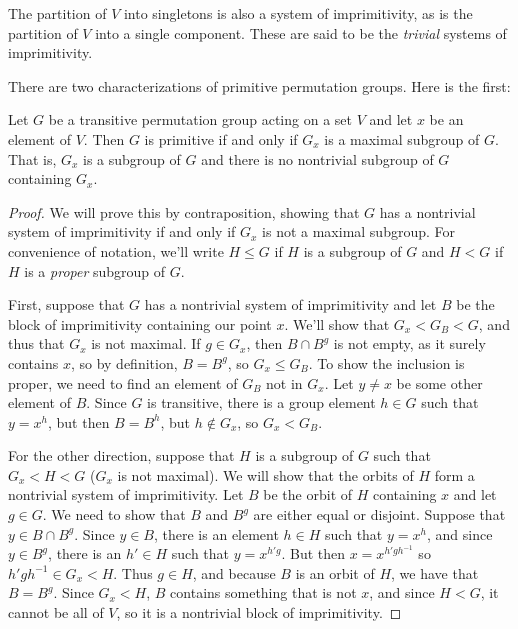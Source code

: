 The partition of $V$ into singletons is also a system of imprimitivity, as is the partition of $V$ into a single component.  These are said to be the \textit{trivial} systems of imprimitivity.


There are two characterizations of primitive permutation groups.  Here is the first:

\begin{lemma}
	
	Let $G$ be a transitive permutation group acting on a set $V$ and let $x$ be an element of $V$.  Then $G$ is primitive if and only if $G_x$ is a maximal subgroup of $G$.  That is, $G_x$ is a subgroup of $G$ and there is no nontrivial subgroup of $G$ containing $G_x$.
	
	
\end{lemma}


\begin{proof}
	
	We will prove this by contraposition, showing that $G$ has a nontrivial system of imprimitivity if and only if $G_x$ is not a maximal subgroup.  For convenience of notation, we'll write $H\leq G$ if $H$ is a subgroup of $G$ and $H<G$ if $H$ is a \textit{proper} subgroup of $G$.
	
	First, suppose that $G$ has a nontrivial system of imprimitivity and let $B$ be the block of imprimitivity containing our point $x$.  We'll show that $G_x<G_B<G$, and thus that $G_x$ is not maximal.  If $g\in G_x$, then $B\cap B^g$ is not empty, as it surely contains $x$, so by definition, $B=B^g$, so $G_x\leq G_B$.  To show the inclusion is proper, we need to find an element of $G_B$ not in $G_x$.  Let $y\neq x$ be some other element of $B$.  Since $G$ is transitive, there is a group element $h\in G$ such that $y=x^h$, but then $B=B^h$, but $h\notin G_x$, so $G_x<G_B$.
	
	For the other direction, suppose that $H$ is a subgroup of $G$ such that $G_x<H<G$ ($G_x$ is not maximal).  We will show that the orbits of $H$ form a nontrivial system of imprimitivity.  Let $B$ be the orbit of $H$ containing $x$ and let $g\in G$.  We need to show that $B$ and $B^g$ are either equal or disjoint.  Suppose that $y\in B\cap B^g$.  Since $y\in B$, there is an element $h\in H$ such that $y=x^h$, and since $y\in B^g$, there is an $h'\in H$ such that $y=x^{h'g}$.  But then $x=x^{h'gh^{-1}}$ so $h'gh^{-1}\in G_x <H$.  Thus $g\in H$, and because $B$ is an orbit of $H$, we have that $B=B^g$.  Since $G_x<H$, $B$ contains something that is not $x$, and since $H<G$, it cannot be all of $V$, so it is a nontrivial block of imprimitivity.
	
	
	
\end{proof}

